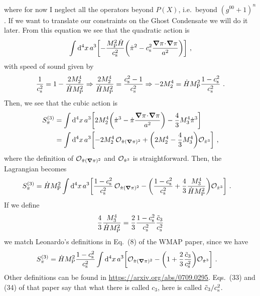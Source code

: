\documentclass[aps,prd,amsmath,floats,floatfix,superscriptaddress,nofootinbib%
]{revtex4}%
\renewcommand\({\left(}
\renewcommand\){\right)}
\renewcommand\[{\left[}
\renewcommand\]{\right]}
\renewcommand{\vec}{\bm}
\def\mpl{M_{\rm P}}
\newcommand{\dif}{\mathrm{d}}
\begin{document}
where for now I neglect all the operators beyond $P(X)$, i.e.~beyond $(g^{00}+1)^n$. 
If we want to translate our constraints on the Ghost Condensate we will do it later. 
From this equation we see that the quadratic action is 
\begin{equation}
\int\dif^4x\,a^3\bigg[{-\frac{\mpl^2\dot{H}}{c^2_{\rm s}}}\bigg(\dot{\pi}^2 - c^2_{\rm s}\frac{\vec{\nabla}\pi\!\cdot\! 
\vec{\nabla}\pi}{a^2}\bigg)\bigg]\,\,, 
\end{equation} 
with speed of sound given by 
\begin{equation} 
\frac{1}{c^2_{\rm s}} = 1-\frac{2M^4_2}{\dot{H}\mpl^2}\Rightarrow \frac{2M^4_2}{\dot{H}\mpl^2} = \frac{c^2_{\rm s}-1}{c^2_{\rm s}} \Rightarrow {-2M^4_2} = {\dot{H}\mpl^2}\frac{1-c^2_{\rm s}}{c^2_{\rm s}}\,\,. 
\end{equation} 
Then, we see that the cubic action is 
\begin{equation}
\begin{split} 
S^{(3)}_\pi &= \int\dif^4x\,a^3\bigg[%
2M^4_2\bigg(\dot{\pi}^3 - \dot{\pi}\frac{\vec{\nabla}\pi\!\cdot\! 
\vec{\nabla}\pi}{a^2}\bigg) - \frac{4}{3}M^4_3\dot{\pi}^3\bigg] \\ 
&= \int\dif^4x\,a^3\bigg[{-2M^4_2}\,{\cal O}_{\dot{\pi}(\vec{\nabla}\pi)^2} + \bigg(2M^4_2 - \frac{4}{3}M^4_3\bigg){\cal O}_{\dot{\pi}^3}\bigg]\,\,, 
\end{split} 
\end{equation}
where the definition of ${\cal O}_{\dot{\pi}(\vec{\nabla}\pi)^2}$ and ${\cal O}_{\dot{\pi}^3}$ is straightforward. Then, the Lagrangian becomes 
\begin{equation}
\begin{split} 
S^{(3)}_\pi &= {\dot{H}\mpl^2}\int\dif^4x\,a^3\bigg[\frac{1-c^2_{\rm s}}{c^2_{\rm s}}\,{\cal O}_{\dot{\pi}(\vec{\nabla}\pi)^2} - \bigg(\frac{1-c^2_{\rm s}}{c^2_{\rm s}} + \frac{4}{3}\frac{M^4_3}{{\dot{H}\mpl^2}}\bigg){\cal O}_{\dot{\pi}^3}\bigg]\,\,. 
\end{split} 
\end{equation} 
If we define 
\begin{equation}
\frac{4}{3}\frac{M^4_3}{{\dot{H}\mpl^2}} = \frac{2}{3} \frac{1-c^2_{\rm s}}{c^2_{\rm s}} \frac{\tilde{c}_3}{c^2_{\rm s}} %
\end{equation} 
we match Leonardo's definitions in Eq.~(8) of the WMAP paper, since we have 
\begin{equation}
\begin{split} 
S^{(3)}_\pi &= {\dot{H}\mpl^2}\frac{1-c^2_{\rm s}}{c^2_{\rm s}}\int\dif^4x\,a^3\bigg[%
{\cal O}_{\dot{\pi}(\vec{\nabla}\pi)^2} - \bigg(1 + \frac{2}{3}\frac{\tilde{c}_3}{c^2_{\rm s}}\bigg){\cal O}_{\dot{\pi}^3}\bigg]\,\,. 
\end{split} 
\end{equation} 
Other definitions can be found in \url{https://arxiv.org/abs/0709.0295}. Eqs.~(33) and (34) of that paper say that what there is called $c_3$, here is called $\tilde{c}_3/c^2_{\rm s}$. 
\end{document}
